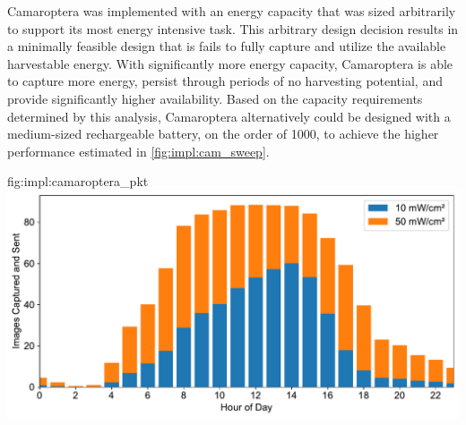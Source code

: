Camaroptera was implemented with an energy capacity that was sized arbitrarily to support its most energy intensive task. This arbitrary design decision results in a minimally feasible design that is fails to fully capture and utilize the 
available harvestable energy.
With significantly more energy capacity, Camaroptera is able to capture more energy, persist through periods of no harvesting potential, and provide significantly higher availability. 
Based on the capacity requirements determined by this analysis, Camaroptera alternatively could be designed with a medium-sized rechargeable battery, on the order of 1000\ssi{\Ah}, to achieve the higher performance estimated in \cref{fig:impl:cam_sweep}.


\begin{definefigure}{fig:impl:camaroptera_pkt}
    \centering
    \includegraphics[width=\linewidth]{figs/chap6/camaroptera_performance.pdf}
    \caption{
        The distribution of simulated Camaroptera transmitted image packets per hour in a day. 
        The distribution represents an average over the length of two synthesized outdoor traces (10 and 50\ssi[per-mode=symbol]{\milli\watt\per\centi\meter\squared}) based on the EnHANTs Setup D trace. 
        Camaroptera operation is limited to times when daylight is available, regardless of the scale of average input power. The average number of packets is significantly lower between 6PM and 6AM.
     }
\end{definefigure}

